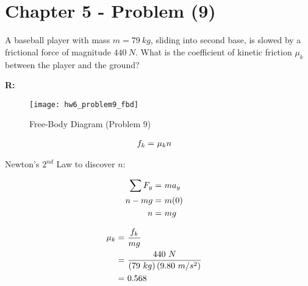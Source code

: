 \section{Chapter 5 - Problem (9)}

	A baseball player with mass $m = 79 \ kg$, sliding into second base, is slowed by a frictional force of magnitude $440 \ N$. What is the coefficient of kinetic friction $\mu_{k}$ between the player and the ground?

	\textbf{R:} \newline

	\begin{figure}[H]
		\begin{center}
			\texttt{[image: hw6\_problem9\_fbd]}
			\caption{Free-Body Diagram (Problem 9)}
			\label{fig:hw6_problem9_fbd}
		\end{center}
	\end{figure}

	\begin{align}
		f_{k} = \ &\mu_{k}n& \notag
	\end{align}

	Newton's $2^{nd}$ Law to discover $n$:

	\begin{align}
		\sum F_{y} = \ &ma_{y}& \notag \\
		n - mg = \ &m(0)& \notag \\
		n = \ &mg& \notag
	\end{align}

	\begin{align}
		\mu_{k} = \ &\frac{f_{k}}{mg}& \notag \\
		= \ &\frac{440 \ N}{(79 \ kg)\left( 9.80 \ m/s^{2} \right)}& \notag \\
		= \ &0.568&
	\end{align}
